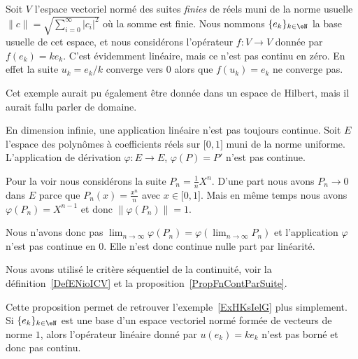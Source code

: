 \begin{example}  \label{ExHKsIelG}
    Soit \( V\) l'espace vectoriel normé des suites \emph{finies} de réels muni de la norme usuelle $\| c \|=\sqrt{\sum_{i=0}^{\infty}| c_i |^2}$ où la somme est finie. Nous nommons \( \{ e_k \}_{k\in \eN}\) la base usuelle de cet espace, et nous considérons l'opérateur \( f\colon V\to V\) donnée par \( f(e_k)=ke_k\). C'est évidemment linéaire, mais ce n'est pas continu en zéro. En effet la suite \( u_k=e_k/k\) converge vers \( 0\) alors que \( f(u_k)=e_k\) ne converge pas.
\end{example}

Cet exemple aurait pu également être donnée dans un espace de Hilbert, mais il aurait fallu parler de domaine.


\begin{example}      \label{EXooDMVJooAJywMU}
    En dimension infinie, une application linéaire n'est pas toujours continue. Soit \( E\) l'espace des polynômes à coefficients réels sur \( \mathopen[ 0 , 1 \mathclose]\) muni de la norme uniforme. L'application de dérivation \( \varphi\colon E\to E\), \( \varphi(P)=P'\) n'est pas continue.

    Pour la voir nous considérons la suite \( P_n=\frac{1}{ n }X^n\). D'une part nous avons \( P_n\to 0\) dans \( E\) parce que \( P_n(x)=\frac{ x^n }{ n }\) avec \( x\in \mathopen[ 0 , 1 \mathclose]\). Mais en même temps nous avons \( \varphi(P_n)=X^{n-1}\) et donc \( \| \varphi(P_n) \|=1\).

    Nous n'avons donc pas \( \lim_{n\to \infty} \varphi(P_n)=\varphi(\lim_{n\to \infty} P_n)\) et l'application \( \varphi\) n'est pas continue en \( 0\). Elle n'est donc continue nulle part par linéarité.

    Nous avons utilisé le critère séquentiel de la continuité, voir la définition~\ref{DefENioICV} et la proposition~\ref{PropFnContParSuite}.
\end{example}

\begin{remark}  \label{RemOAXNooSMTDuN}
Cette proposition permet de retrouver l'exemple~\ref{ExHKsIelG} plus simplement. Si \( \{ e_k \}_{k\in \eN}\) est une base d'un espace vectoriel normé formée de vecteurs de norme \( 1\), alors l'opérateur linéaire donné par \( u(e_k)=ke_k\) n'est pas borné et donc pas continu.
\end{remark}


